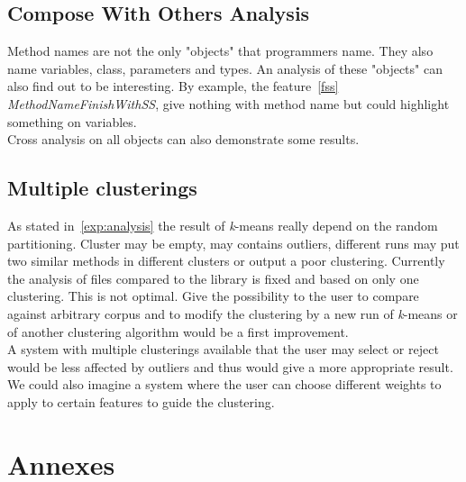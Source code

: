 \documentclass[12pt]{article}
\begin{document}
\subsection{Compose With Others Analysis}
Method names are not the only "objects" that programmers name. They also name variables, class, parameters and types. An analysis of these "objects" can also find out to be interesting. By example, the feature~\ref{fss} \textit{MethodNameFinishWithSS}, give nothing with method name but could highlight something on variables.\\
Cross analysis on all objects can also demonstrate some results.
\subsection{Multiple clusterings}
As stated in~\ref{exp:analysis} the result of \textit{k}-means really depend on the random partitioning. Cluster may be empty, may contains outliers, different runs may put two similar methods in different clusters or output a poor clustering. Currently the analysis of files compared to the library is fixed and based on only one clustering. This is not optimal. Give the possibility to the user to compare against arbitrary corpus and to modify the clustering by a new run of \textit{k}-means or of another clustering algorithm would be a first improvement.\\
A system with multiple clusterings available that the user may select or reject would be less affected by outliers and thus would give a more appropriate result.\\
We could also imagine a system where the user can choose different weights to apply to certain features to guide the clustering.
\newpage
\section{Annexes}
\end{document}
